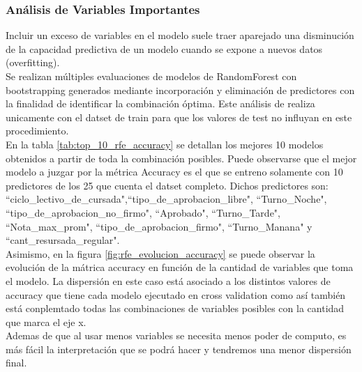 \subsubsection{Análisis de Variables Importantes}\label{analisis-var_importantes}

Incluir un exceso de variables en el modelo suele traer aparejado una disminución de la capacidad predictiva de un modelo cuando se expone a nuevos datos (overfitting). \\
Se realizan múltiples evaluaciones de modelos de RandomForest con bootstrapping generados mediante incorporación y eliminación de predictores con la finalidad de identificar la combinación óptima. Este análisis de realiza unicamente con el datset de train para que los valores de test no influyan en este procedimiento.\\

En la tabla \ref{tab:top_10_rfe_accuracy} se detallan los mejores 10 modelos obtenidos a partir de toda la combinación posibles. Puede observarse que el mejor modelo a juzgar por la métrica Accuracy es el que se entreno solamente con 10 predictores de los 25 que cuenta el datset completo. Dichos predictores son: 
``ciclo\_lectivo\_de\_cursada",``tipo\_de\_aprobacion\_libre", ``Turno\_Noche", ``tipo\_de\_aprobacion\_no\_firmo", ``Aprobado", ``Turno\_Tarde", ``Nota\_max\_prom", ``tipo\_de\_aprobacion\_firmo", ``Turno\_Manana" y ``cant\_resursada\_regular".\\

Asimismo, en la figura \ref{fig:rfe_evolucion_accuracy} se puede observar la evolución de la mátrica accuracy en función de la cantidad de variables que toma el modelo. La dispersión en este caso está asociado a los distintos valores de accuracy que tiene cada modelo ejecutado en cross validation como así también está conplemtado todas las combinaciones de variables posibles con la cantidad que marca el eje x.\\
Ademas de que al usar menos variables se necesita menos poder de computo, es más fácil la interpretación que se podrá hacer y tendremos una menor dispersión final.

